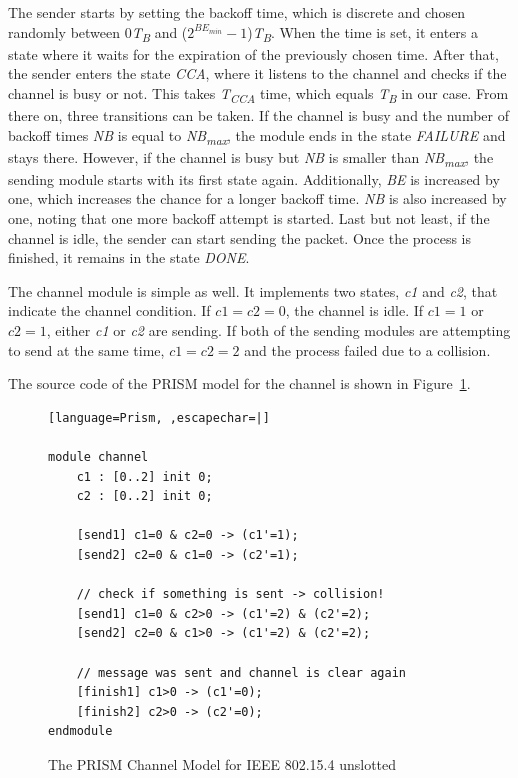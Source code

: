 \documentclass[
a4paper,
12pt
]{scrartcl}
\begin{document}
The sender starts by setting the backoff time, which is discrete and chosen randomly between 0\textit{T\textsubscript{B}} and ($2^{BE_{min}} - 1$)\textit{T\textsubscript{B}}. When the time is set, it enters a state where it waits for the expiration of the previously chosen time. After that, the sender enters the state \emph{CCA}, where it listens to the channel and checks if the channel is busy or not. This takes \textit{T\textsubscript{CCA}} time, which equals \textit{T\textsubscript{B}} in our case. From there on, three transitions can be taken. If the channel is busy and the number of backoff times \textit{NB} is equal to \textit{NB\textsubscript{max}}, the module ends in the state \textit{FAILURE} and stays there. However, if the channel is busy but \textit{NB} is smaller than \textit{NB\textsubscript{max}}, the sending module starts with its first state again. Additionally, \textit{BE} is increased by one, which increases the chance for a longer backoff time. \textit{NB} is also increased by one, noting that one more backoff attempt is started. Last but not least, if the channel is idle, the sender can start sending the packet. Once the process is finished, it remains in the state \textit{DONE}.

The channel module is simple as well. It implements two states, \textit{c1} and \textit{c2}, that indicate the channel condition. If $c1=c2=0$, the channel is idle. If $c1=1$ or $c2=1$, either \textit{c1} or \textit{c2} are sending. If both of the sending modules are attempting to send at the same time, $c1=c2=2$ and the process failed due to a collision.

The source code of the PRISM model for the channel is shown in Figure~\ref{fig:channelmodel}.

\begin{figure}[ht!]
\begin{lstlisting}[language=Prism, ,escapechar=|]

module channel
	c1 : [0..2] init 0;
	c2 : [0..2] init 0;

	[send1] c1=0 & c2=0 -> (c1'=1);
	[send2] c2=0 & c1=0 -> (c2'=1);

	// check if something is sent -> collision!
	[send1] c1=0 & c2>0 -> (c1'=2) & (c2'=2);
	[send2] c2=0 & c1>0 -> (c1'=2) & (c2'=2);

	// message was sent and channel is clear again
	[finish1] c1>0 -> (c1'=0);
	[finish2] c2>0 -> (c2'=0);
endmodule

\end{lstlisting}
\caption{The PRISM Channel Model for IEEE 802.15.4 unslotted}
\label{fig:channelmodel}
\end{figure}
\end{document}
